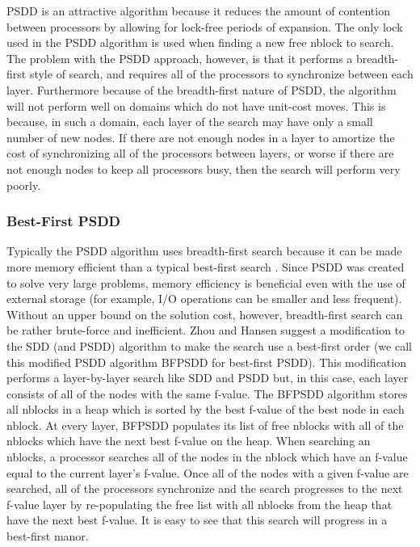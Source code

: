 \documentclass{article}
\begin{document}
PSDD is an attractive algorithm because it reduces the amount of
contention between processors by allowing for lock-free periods of
expansion.  The only lock used in the PSDD algorithm is used when
finding a new free nblock to search.  The problem with the PSDD
approach, however, is that it performs a breadth-first style of
search, and requires all of the processors to synchronize between each
layer.  Furthermore because of the breadth-first nature of PSDD, the
algorithm will not perform well on domains which do not have unit-cost
moves.  This is because, in such a domain, each layer of the search
may have only a small number of new nodes.  If there are not enough
nodes in a layer to amortize the cost of synchronizing all of the
processors between layers, or worse if there are not enough nodes to
keep all processors busy, then the search will perform very poorly.

\subsubsection{Best-First PSDD}

Typically the PSDD algorithm uses breadth-first search because it can
be made more memory efficient than a typical best-first search
\cite{zhou:bhs}.  Since PSDD was created to solve very large problems,
memory efficiency is beneficial even with the use of external storage
(for example, I/O operations can be smaller and less frequent).
Without an upper bound on the solution cost, however, breadth-first
search can be rather brute-force and inefficient.  Zhou and Hansen
suggest a modification to the SDD (and PSDD) algorithm to make the
search use a best-first order \cite{zhou:sdd} (we call this modified
PSDD algorithm BFPSDD for best-first PSDD).  This modification
performs a layer-by-layer search like SDD and PSDD but, in this case,
each layer consists of all of the nodes with the same f-value.  The
BFPSDD algorithm stores all nblocks in a heap which is sorted by the
best f-value of the best node in each nblock.  At every layer, BFPSDD
populates its list of free nblocks with all of the nblocks which have
the next best f-value on the heap.  When searching an nblocks, a
processor searches all of the nodes in the nblock which have an
f-value equal to the current layer's f-value.  Once all of the nodes
with a given f-value are searched, all of the processors synchronize
and the search progresses to the next f-value layer by re-populating
the free list with all nblocks from the heap that have the next best
f-value.  It is easy to see that this search will progress in a
best-first manor.
\end{document}
